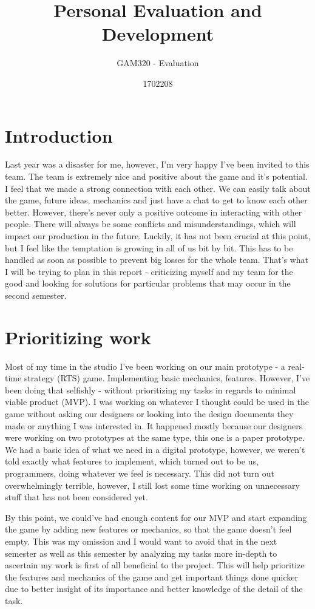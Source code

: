 \documentclass{scrartcl}
\title{Personal Evaluation and Development} %
\subtitle{GAM320 - Evaluation}
\author{1702208}
\begin{document}
\maketitle

\section{Introduction}
Last year was a disaster for me, however, I'm very happy I've been invited to this team. The team is extremely nice and positive about the game and it's potential. I feel that we made a strong connection with each other. We can easily talk about the game, future ideas, mechanics and just have a chat to get to know each other better. However, there's never only a positive outcome in interacting with other people. There will always be some conflicts and misunderstandings, which will impact our production in the future. Luckily, it has not been crucial at this point, but I feel like the temptation is growing in all of us bit by bit. This has to be handled as soon as possible to prevent big losses for the whole team. That's what I will be trying to plan in this report - criticizing myself and my team for the good and looking for solutions for particular problems that may occur in the second semester.

\section{Prioritizing work}
Most of my time in the studio I've been working on our main prototype - a real-time strategy (RTS) game. Implementing basic mechanics, features. However, I've been doing that selfishly - without prioritizing my tasks in regards to minimal viable product (MVP). I was working on whatever I thought could be used in the game without asking our designers or looking into the design documents they made or anything I was interested in. It happened mostly because our designers were working on two prototypes at the same type, this one is a paper prototype. We had a basic idea of what we need in a digital prototype, however, we weren't told exactly what features to implement, which turned out to be us, programmers, doing whatever we feel is necessary. This did not turn out overwhelmingly terrible, however, I still lost some time working on unnecessary stuff that has not been considered yet. 

By this point, we could've had enough content for our MVP and start expanding the game by adding new features or mechanics, so that the game doesn't feel empty. This was my omission and I would want to avoid that in the next semester as well as this semester by analyzing my tasks more in-depth to ascertain my work is first of all beneficial to the project. This will help prioritize the features and mechanics of the game and get important things done quicker due to better insight of its importance and better knowledge of the detail of the task.
\end{document}
